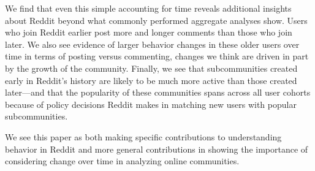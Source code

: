 We find that even this simple accounting for time reveals additional insights about Reddit beyond what commonly performed aggregate analyses show.  Users who join Reddit earlier post more and longer comments than those who join later.  We also see evidence of larger behavior changes in these older users over time in terms of posting versus commenting, changes we think are driven in part by the growth of the community.  Finally, we see that subcommunities created early in Reddit's history are likely to be much more active than those created later---and that the popularity of these communities spans across all user cohorts because of policy decisions Reddit makes in matching new users with popular subcommunities. 

We see this paper as both making specific contributions to understanding behavior in Reddit and more general contributions in showing the importance of considering change over time in analyzing online communities.  





